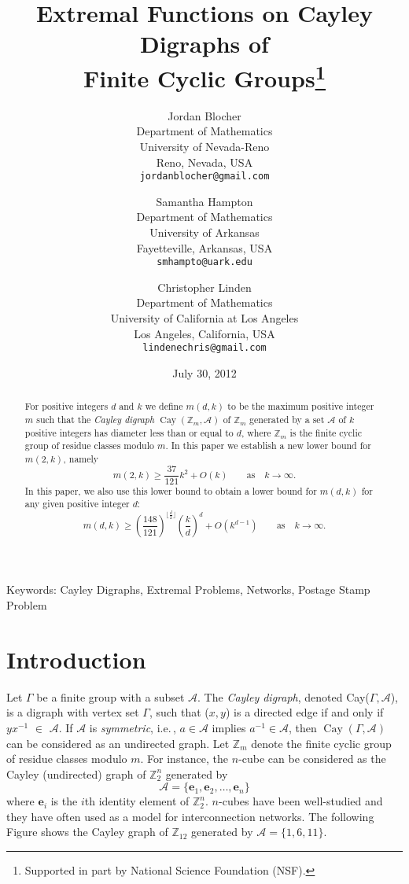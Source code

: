 \documentclass[11pt]{article}
\title{Extremal Functions on Cayley Digraphs of\\ Finite Cyclic Groups\footnote{Supported in part by National Science Foundation (NSF).}}
\author{{\sc Jordan Blocher}\\ 
Department of Mathematics\\ 
University of Nevada-Reno\\ 
Reno, Nevada, USA\\
{\tt jordanblocher@gmail.com}
\and 
{\sc Samantha Hampton}\\
Department of Mathematics\\
University of Arkansas\\
Fayetteville, Arkansas, USA\\
{\tt smhampto@uark.edu}
\and 
{\sc Christopher Linden}\\
Department of Mathematics\\
University of California  at Los Angeles\\
Los Angeles, California, USA\\
{\tt lindenechris@gmail.com} }
\date{July 30, 2012}
\theoremstyle{definition}
\def\Z{\mbox{$\mathbb Z$}}
\def\Cay{\operatorname{Cay}}
\begin{document}
 
\baselineskip6mm\parskip4mm

\maketitle

\begin{abstract}
For positive integers $d$ and $k$ we define $m(d,k)$ to be the maximum positive integer $m$ such that the \emph{Cayley digraph} $\Cay(\Z_{m}, \mathscr{A})$ of $\Z_{m}$ generated by a set $\mathscr{A}$ of $k$ positive integers   has diameter less than or equal to $d$, where $\Z_{m}$ is the finite cyclic group of residue classes modulo $m$.
In this paper we establish a new lower bound for $m(2, k)$, namely
\[
 m(2,k) \geq \frac{37}{121}k^2 + O(k)\qquad\text{as}\quad k\to\infty.
\]
In this paper, we  also use this lower bound to obtain a lower bound for  $m(d,k)$ for any given positive integer $d$:
\[
m(d,k) \geq \left(\frac{148}{121}\right)^{\lfloor \frac{d}{2}\rfloor}\left(\frac{k}{d}\right)^d + O(k^{d-1})\qquad\text{as}\quad k\to\infty.
\]
\end{abstract}
 
{\small\sc Keywords:} {\small Cayley Digraphs, Extremal Problems, Networks, Postage Stamp Problem}
 

\section{Introduction}
Let $\Gamma$ be a finite group with a subset $\mathscr{A}$. The \emph{Cayley digraph}, denoted Cay($\Gamma, \mathscr{A}$), is a digraph with vertex set $\Gamma$, such that ($x, y$) is a directed edge if and only if $yx^{-1}$ $\in$ $\mathscr{A}$.  If $\mathscr A$ is {\em symmetric}, i.e.\,, $a\in \mathscr A$ implies $a^{-1}\in \mathscr A$, then $\Cay(\Gamma,\mathscr A)$ can be considered as an undirected graph.  Let $\Z_{m}$ denote the finite cyclic group of residue classes modulo $m$.  For instance, the $n$-cube can be considered as the Cayley (undirected) graph of $\Z_{2}^{n}$ generated by 
\[
\mathscr {A}=\{\mathbf e_{1},\mathbf e_{2},\ldots,\mathbf e_{n}\}
\]
where $\mathbf e_{i}$ is the $i$th identity element of $\Z_{2}^{n}$. $n$-cubes have been  well-studied and they have often  used as a model for interconnection networks. The following Figure shows the Cayley graph of $\Z_{12}$ generated by $\mathscr A=\{1,6,11\}$.
\end{document}
